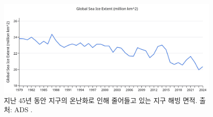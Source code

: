 \documentclass[10pt,twocolumn,letterpaper]{article}
\begin{document}
\begin{figure}[t]
\begin{center}
\includegraphics[width=1\textwidth]{ice.jpg}
\end{center}
   \caption{지난 45년 동안 지구의 온난화로 인해 줄어들고 있는 지구 해빙 면적. 출처: ADS \cite{149}.}
\label{fig:22}
\end{figure}

\clearpage
\twocolumn

{\small
\renewcommand{\refname}{참고문헌}


}
\end{document}
